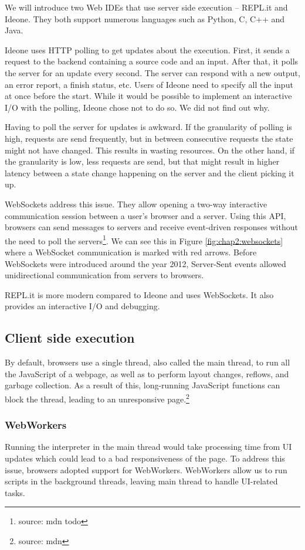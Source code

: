 We will introduce two Web IDEs that use server side execution -- REPL.it and Ideone. They both support numerous languages such
as Python, C, C++ and Java.

Ideone uses HTTP polling to get updates about the execution. First, it sends a request to the backend containing a source code and an input.
After that, it polls the server for an update every second. The server can respond with a new output, an error report, a finish status, etc. Users of Ideone need to
specify all the input at once before the start. While it would be possible to implement an interactive I/O with the polling, Ideone chose not to do so.
We did not find out why.

Having to poll the server for updates is awkward. If the granularity of polling is high, requests are send frequently, but
in between consecutive requests the state might not have changed. This results in wasting resources. On the other hand, if the granularity is low, less
requests are send, but that might result in higher latency between a state change happening on the server and the client picking it up.

WebSockets address this issue. They allow opening a two-way interactive communication session between a user's browser and a server.
Using this API, browsers can send messages to servers and receive event-driven responses without the need to poll the servers\footnote{source: mdn todo}.
We can see this in Figure \ref{fig:chap2:websockets} where a WebSocket communication is marked with red arrows.
Before WebSockets were introduced around the year 2012, Server-Sent events allowed unidirectional communication from servers to browsers.

REPL.it is more modern compared to Ideone and uses WebSockets. It also provides an interactive I/O and debugging.

\subsection{Client side execution}
By default, browsers use a single thread, also called the main thread, to run all the JavaScript of a webpage, as well as to perform layout
changes, reflows, and garbage collection. As a result of this, long-running JavaScript functions can block the thread, leading to an unresponsive
page.\footnote{source: mdn}

\subsubsection{WebWorkers}
Running the interpreter in the main thread would take processing time from UI updates which could lead to a bad responsiveness of the page. To
address this issue, browsers adopted support for WebWorkers. WebWorkers allow us to run scripts in the background threads, leaving main thread
to handle UI-related tasks.

